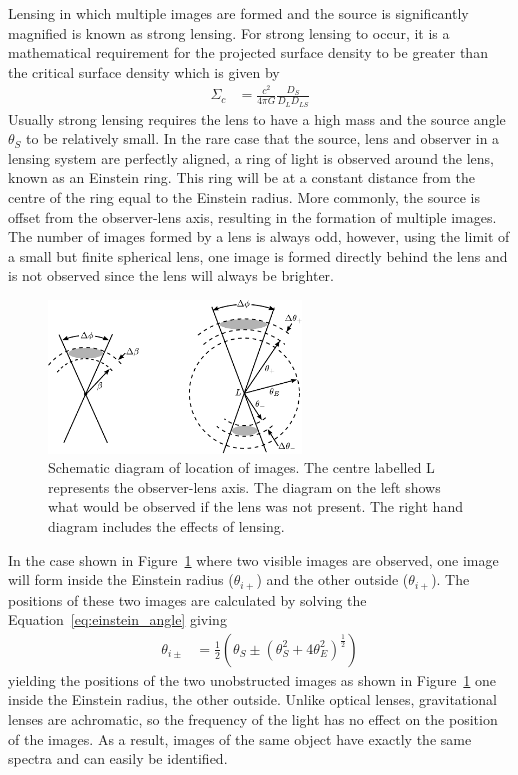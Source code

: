 		Lensing in which multiple images are formed and the source is significantly magnified is known as strong lensing. For strong lensing to occur, it is a mathematical requirement for the projected surface density to be greater than the critical surface density which is given by\cite{Critical_surface_density}
		\begin{align}
			\Sigma_c &= \frac{c^2}{4\pi G}\frac{D_S}{D_L D_{LS}}
		\end{align}
		Usually strong lensing requires the lens to have a high mass and the source angle $\theta_S$ to be relatively small. In the rare case that the source, lens and observer in a lensing system are perfectly aligned, a ring of light is observed around the lens, known as an Einstein ring. This ring will be at a constant distance from the centre of the ring equal to the Einstein radius. More commonly, the source is offset from the observer-lens axis, resulting in the formation of multiple images. The number of images formed by a lens is always odd, however, using the limit of a small but finite spherical lens, one image is formed directly behind the lens and is not observed since the lens will always be brighter.
		\begin{figure}[!htbp]
			\centering
				\includegraphics[width=0.6\textwidth]{../Images/Lensing_image_positions2.pdf}
				\caption[Schematic diagram of location of images]{Schematic diagram of location of images. The centre labelled L represents the observer-lens axis. The diagram on the left shows what would be observed if the lens was not present. The right hand diagram includes the effects of lensing\cite{Hartle}.\label{fig:Lensing_image_positions2}}
		\end{figure}

		In the case shown in Figure~\ref{fig:Lensing_image_positions2} where two visible images are observed, one image will form inside the Einstein radius ($\theta_{i+}$) and the other outside ($\theta_{i+}$). The positions of these two images are calculated by solving the Equation~\ref{eq:einstein_angle} giving
		\begin{align}
			\theta_{i\pm} &= \frac{1}{2}\left( \theta_S \pm {(\theta_S^2 + 4\theta_E^2)} ^{\frac{1}{2}} \right) \label{eq:image_position}
		\end{align}
		yielding the positions of the two unobstructed images as shown in Figure~\ref{fig:Lensing_image_positions2} one inside the Einstein radius, the other outside. Unlike optical lenses, gravitational lenses are achromatic, so the frequency of the light has no effect on the position of the images. As a result, images of the same object have exactly the same spectra and can easily be identified\cite{Hartle}.

